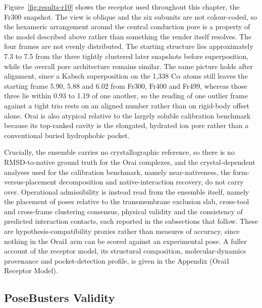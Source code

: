 Figure~\ref{fig:results-r10} shows the receptor used throughout this chapter, the Fr300 snapshot. The view is oblique and the six subunits are not colour-coded, so the hexameric arrangement around the central conduction pore is a property of the model described above rather than something the render itself resolves. The four frames are not evenly distributed. The starting structure lies approximately 7.3 to 7.5 \angstrom{} from the three tightly clustered later snapshots before superposition, while the overall pore architecture remains similar. The same picture holds after alignment, since a Kabsch superposition on the 1,338 C\ensuremath{\alpha} atoms still leaves the starting frame 5.90, 5.88 and 6.02 \angstrom{} from Fr300, Fr400 and Fr499, whereas those three lie within 0.93 to 1.19 \angstrom{} of one another, so the reading of one outlier frame against a tight trio rests on an aligned number rather than on rigid-body offset alone. Orai is also atypical relative to the largely soluble calibration benchmark because its top-ranked cavity is the elongated, hydrated ion pore rather than a conventional buried hydrophobic pocket.

Crucially, the ensemble carries no crystallographic reference, so there is no RMSD-to-native ground truth for the Orai complexes, and the crystal-dependent analyses used for the calibration benchmark, namely near-nativeness, the form-versus-placement decomposition and native-interaction recovery, do not carry over. Operational admissibility is instead read from the ensemble itself, namely the placement of poses relative to the transmembrane exclusion slab, cross-tool and cross-frame clustering consensus, physical validity and the consistency of predicted interaction contacts, each reported in the subsections that follow. These are hypothesis-compatibility proxies rather than measures of accuracy, since nothing in the Orai1 arm can be scored against an experimental pose. A fuller account of the receptor model, its structural composition, molecular-dynamics provenance and pocket-detection profile, is given in the Appendix (Orai1 Receptor Model).

\hypertarget{posebusters-validity-1}{%
\subsection{\texorpdfstring{PoseBusters Validity}{ PoseBusters Validity}}\label{posebusters-validity-1}}

